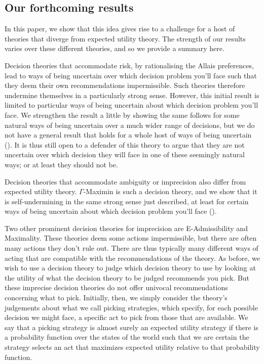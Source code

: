 \documentclass[a4paper,final]{article}
\newenvironment{CCM rewritten}
{\begingroup\color{blue}} %
{\endgroup}              %
\begin{document}
	\subsection{Our forthcoming results}

	
	
	In this paper, we show that this idea gives rise to a challenge for a host of theories that diverge from expected utility theory. The strength of our results varies over these different theories, and so we provide a summary here.
	
	Decision theories that accommodate risk, by rationalising the Allais preferences, lead to ways of being uncertain over which decision problem you'll face such that they deem their own recommendations impermissible. Such theories therefore undermine themselves in a particularly strong sense. However, this initial result is limited to particular ways of being uncertain about which decision problem you'll face. We strengthen the result a little by showing the same follows for some natural ways of being uncertain over a much wider range of decisions, but we do not have a general result that holds for a whole host of ways of being uncertain (). It is thus still open to a defender of this theory to argue that they are not uncertain over which decision they will face in one of these seemingly natural ways; or at least they should not be. 
	
	Decision theories that accommodate ambiguity or imprecision also differ from expected utility theory. $\Gamma$-Maximin is such a decision theory, and we show that it is self-undermining in the same strong sense just described, at least for certain ways of being uncertain about which decision problem you'll face ().
	
	Two other prominent decision theories for imprecision are E-Admissibility and Maximality. 	
	These theories deem some actions impermissible, but there are often many actions they don't rule out. There are thus typically many different ways of acting that are compatible with the recommendations of the theory. 
	As before, we wish to use a decision theory to judge which decision theory to use by looking at the utility of what the decision theory to be judged recommends you pick. But these imprecise decision theories do not offer univocal recommendations concerning what to pick. Initially, then, we simply consider the theory's judgements about what we call picking strategies, which specify, for each possible decision we might face, a specific act to pick from those that are available. We say that a picking strategy is almost surely an expected utility strategy if there is a probability function over the states of the world such that we are certain the strategy selects an act that maximizes expected utility relative to that probability function.
	 
\end{document}
